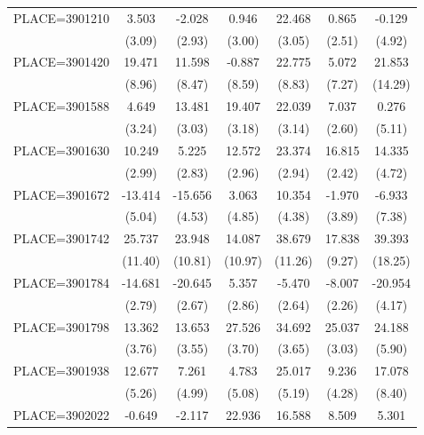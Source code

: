 {\begin{tabular}{l*{6}{c}}
PLACE=3901210       &       3.503&      -2.028&       0.946&      22.468&       0.865&      -0.129\\
                    &      (3.09)&      (2.93)&      (3.00)&      (3.05)&      (2.51)&      (4.92)\\
PLACE=3901420       &      19.471&      11.598&      -0.887&      22.775&       5.072&      21.853\\
                    &      (8.96)&      (8.47)&      (8.59)&      (8.83)&      (7.27)&     (14.29)\\
PLACE=3901588       &       4.649&      13.481&      19.407&      22.039&       7.037&       0.276\\
                    &      (3.24)&      (3.03)&      (3.18)&      (3.14)&      (2.60)&      (5.11)\\
PLACE=3901630       &      10.249&       5.225&      12.572&      23.374&      16.815&      14.335\\
                    &      (2.99)&      (2.83)&      (2.96)&      (2.94)&      (2.42)&      (4.72)\\
PLACE=3901672       &     -13.414&     -15.656&       3.063&      10.354&      -1.970&      -6.933\\
                    &      (5.04)&      (4.53)&      (4.85)&      (4.38)&      (3.89)&      (7.38)\\
PLACE=3901742       &      25.737&      23.948&      14.087&      38.679&      17.838&      39.393\\
                    &     (11.40)&     (10.81)&     (10.97)&     (11.26)&      (9.27)&     (18.25)\\
PLACE=3901784       &     -14.681&     -20.645&       5.357&      -5.470&      -8.007&     -20.954\\
                    &      (2.79)&      (2.67)&      (2.86)&      (2.64)&      (2.26)&      (4.17)\\
PLACE=3901798       &      13.362&      13.653&      27.526&      34.692&      25.037&      24.188\\
                    &      (3.76)&      (3.55)&      (3.70)&      (3.65)&      (3.03)&      (5.90)\\
PLACE=3901938       &      12.677&       7.261&       4.783&      25.017&       9.236&      17.078\\
                    &      (5.26)&      (4.99)&      (5.08)&      (5.19)&      (4.28)&      (8.40)\\
PLACE=3902022       &      -0.649&      -2.117&      22.936&      16.588&       8.509&       5.301\\

\end{tabular}}
